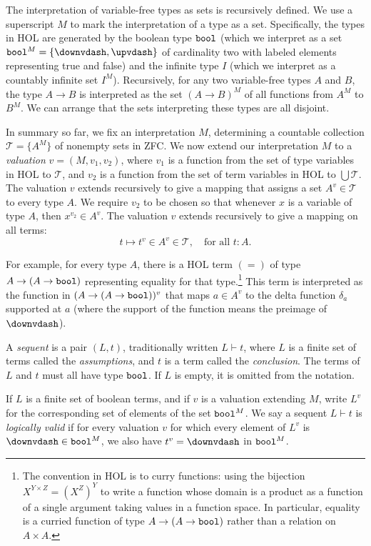 \documentclass[brochure,english,12pt]{bourbaki}
\theoremstyle{plain}
\def\op#1{{\operatorname{#1}}}
\def\bool{\op{\tt bool}}
\def\T{{\mathcal T}}
\begin{document}
The interpretation of variable-free types as sets is recursively
defined.  We use a superscript $M$ to mark the interpretation of a
type as a set.  Specifically, the types in HOL are generated by the
boolean type $\bool$ (which we interpret as a set
$\bool^M=\{\downvdash ,\upvdash \}$ of cardinality two with labeled
elements representing true and false) and the infinite type $I$
(which we interpret as a countably infinite set $I^M$).  Recursively,
for any two variable-free types $A$ and $B$, the type $A\to B$ is
interpreted as the set $(A\to B)^M$ of all functions from $A^M$ to
$B^M$.  We can arrange that the sets interpreting these types are all
disjoint.

In summary so far, we fix an interpretation $M$, determining a
countable collection $\T =\{A^M\}$ of nonempty sets in ZFC.  We now
extend our interpretation $M$ to a {\it valuation} $v=(M,v_1,v_2)$,
where $v_1$ is a function from the set of type variables in HOL to
$\T$, and $v_2$ is a function from the set of term variables in HOL to
$\bigcup\T$.  The valuation $v$ extends recursively to give a mapping
that assigns a set $A^{v}\in \T$ to every type $A$.  We require $v_2$
to be chosen so that whenever $x$ is a variable of type $A$, then
$x^{v_2} \in A^v$.  The valuation $v$ extends recursively to give a
mapping on all terms:
\[
t\mapsto t^v \in A^v \in \T, \quad \text{for all } t:A.
\]

For example, for every type $A$, there is a HOL term $(=)$ of type
$A\to (A\to \bool)$ representing equality for that type.\footnote{The
  convention in HOL is to curry functions: using the bijection $X^{Y
    \times Z} = (X^Z)^Y$ to write a function whose domain is a product
  as a function of a single argument taking values in a function
  space. In particular, equality is a curried function of type $A\to
  (A \to\bool)$ rather than a relation on $A\times A$.}  This term is
interpreted as the function in $(A\to (A\to\bool))^v$ that maps $a\in
A^{v}$ to the delta function $\delta_a$ supported at $a$ (where the
support of the function means the preimage of $\downvdash$).


A {\it sequent} is a pair $(L,t)$, traditionally written $L\vdash t$,
where $L$ is a finite set of terms called the {\it assumptions}, and
$t$ is a term called the {\it conclusion}.  The terms of $L$ and $t$
must all have type $\bool$.  If $L$ is empty, it is omitted from the
notation.

If $L$ is a finite set of boolean terms, and if $v$ is a valuation
extending $M$, write $L^{v}$ for the corresponding set of elements of
the set $\bool^M$.  We say a sequent $L \vdash t$ is {\it logically
  valid} if for every valuation $v$ for which every element of $L^{v}$
is $\downvdash \in \bool^M$, we also have $t^{v}=\downvdash $ in
$\bool^M$.
\end{document}
